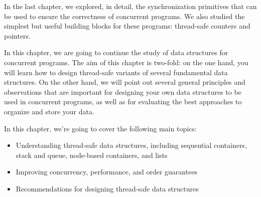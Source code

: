 In the last chapter, we explored, in detail, the synchronization primitives that can be used to ensure the correctness of concurrent programs. We also studied the simplest but useful building blocks for these programs: thread-safe counters and pointers.

In this chapter, we are going to continue the study of data structures for concurrent programs. The aim of this chapter is two-fold: on the one hand, you will learn how to design thread-safe variants of several fundamental data structures. On the other hand, we will point out several general principles and observations that are important for designing your own data structures to be used in concurrent programs, as well as for evaluating the best approaches to organize and store your data.

In this chapter, we're going to cover the following main topics:

\begin{itemize}
\item
Understanding thread-safe data structures, including sequential containers, stack and queue, node-based containers, and lists

\item
Improving concurrency, performance, and order guarantees

\item
Recommendations for designing thread-safe data structures

\end{itemize}















